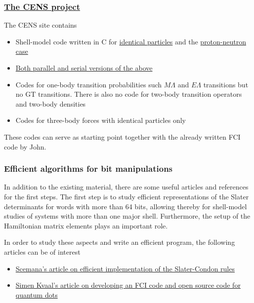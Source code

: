\documentclass{beamer}
\begin{document}
\begin{frame}
\frametitle{\href{{https://github.com/ManyBodyPhysics/CENS}}{The CENS project}}

\begin{block}{}
The CENS  site contains 
\begin{itemize}
\item Shell-model code written in C for \href{{https://github.com/ManyBodyPhysics/CENS/tree/master/FCI/serial/IdenticalParticles}}{identical particles} and the \href{{https://github.com/ManyBodyPhysics/CENS/tree/master/FCI/serial/pnCase}}{proton-neutron case}

\item \href{{https://github.com/ManyBodyPhysics/CENS/tree/master/FCI}}{Both parallel and serial versions of the above}

\item Codes for one-body transition probabilities such $M\Lambda$ and $E\Lambda$ transitions but no GT transitions. There is also no code for two-body transition operators and two-body densities

\item Codes for three-body forces with identical particles only
\end{itemize}

\noindent
These codes can serve as starting point together with the already written FCI code by John. 
\end{block}
\end{frame}

\begin{frame}
\frametitle{Efficient algorithms for bit manipulations}

\begin{block}{}
In addition to the existing material, there are some useful articles and references for the first steps. 
The first step is to study efficient representations of the Slater determinants for words with more than 64 bits, allowing thereby for shell-model studies 
of systems with more than one major shell. Furthermore, the setup of the Hamiltonian matrix elements plays an important role. 

In order to study these aspects and write an efficient program, the following articles can be of interest
\begin{itemize}
\item \href{{http://arxiv.org/abs/1311.6244}}{Scemana's article on efficient implementation of the Slater-Condon rules}

\item \href{{http://arxiv.org/abs/0810.2644}}{Simen Kvaal's article on developing an FCI code and open source code for quantum dots}
\end{itemize}

\noindent
\end{block}
\end{frame}
\end{document}
